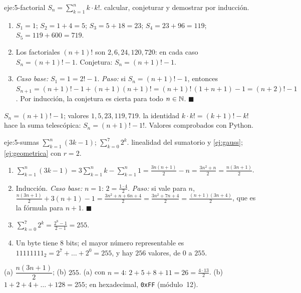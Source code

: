 \begin{solucion}{eje:5-factorial}
\datos $S_n=\sum_{k=1}^{n}k\cdot k!$.
\planteamiento calcular, conjeturar y demostrar por inducción.
\pasos
\begin{enumerate}[label=\arabic*.]
  \item $S_1=1$; $S_2=1+4=5$; $S_3=5+18=23$; $S_4=23+96=119$; $S_5=119+600=719$.
  \item Los factoriales $(n+1)!$ son $2,6,24,120,720$: en cada caso $S_n=(n+1)!-1$. Conjetura: $S_n=(n+1)!-1$.
  \item \emph{Caso base:} $S_1=1=2!-1$. \emph{Paso:} si $S_n=(n+1)!-1$, entonces $S_{n+1}=(n+1)!-1+(n+1)(n+1)!=(n+1)!\,(1+n+1)-1=(n+2)!-1$. Por inducción, la conjetura es cierta para todo $n\in\mathbb{N}$. $\blacksquare$
\end{enumerate}
\resultado $S_n=(n+1)!-1$; valores $1,5,23,119,719$.
\comprobacion la identidad $k\cdot k!=(k+1)!-k!$ hace la suma telescópica: $S_n=(n+1)!-1!$. Valores comprobados con Python.
\end{solucion}

\begin{solucion}{eje:5-sumas}
\datos $\sum_{k=1}^{n}(3k-1)$; $\sum_{k=0}^{7}2^{k}$.
\planteamiento linealidad del sumatorio y \cref{ej:gauss}; \cref{ej:geometrica} con $r=2$.
\pasos
\begin{enumerate}[label=\arabic*.]
  \item $\sum_{k=1}^{n}(3k-1)=3\sum_{k=1}^{n}k-\sum_{k=1}^{n}1=\frac{3n(n+1)}{2}-n=\frac{3n^{2}+n}{2}=\frac{n(3n+1)}{2}$.
  \item Inducción. \emph{Caso base:} $n=1$: $2=\frac{1\cdot 4}{2}$. \emph{Paso:} si vale para $n$, $\frac{n(3n+1)}{2}+3(n+1)-1=\frac{3n^{2}+n+6n+4}{2}=\frac{3n^{2}+7n+4}{2}=\frac{(n+1)(3n+4)}{2}$, que es la fórmula para $n+1$. $\blacksquare$
  \item $\sum_{k=0}^{7}2^{k}=\frac{2^{8}-1}{2-1}=255$.
  \item Un byte tiene 8 bits; el mayor número representable es $11111111_2=2^{7}+\dots+2^{0}=255$, y hay $256$ valores, de $0$ a $255$.
\end{enumerate}
\resultado (a) $\dfrac{n(3n+1)}{2}$; (b) $255$.
\comprobacion (a) con $n=4$: $2+5+8+11=26=\frac{4\cdot 13}{2}$. (b) $1+2+4+\dots+128=255$; en hexadecimal, \texttt{0xFF} (módulo~12).
\end{solucion}

